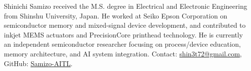 \documentclass[conference]{IEEEtran}
\begin{document}
\begin{IEEEbiography}{Shinichi Samizo}
received the M.S. degree in Electrical and Electronic Engineering from Shinshu University, Japan. 
He worked at Seiko Epson Corporation on semiconductor memory and mixed-signal device development, and contributed to inkjet MEMS actuators and PrecisionCore printhead technology. 
He is currently an independent semiconductor researcher focusing on process/device education, memory architecture, and AI system integration.  
Contact: \href{mailto:shin3t72@gmail.com}{shin3t72@gmail.com}, GitHub: \href{https://github.com/Samizo-AITL}{Samizo-AITL}.
\end{IEEEbiography}
\end{document}
